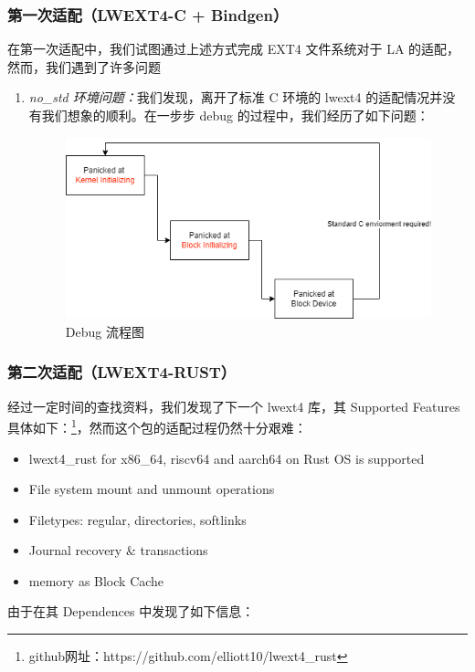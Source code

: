 \subsubsection{第一次适配（LWEXT4-C + Bindgen）}

在第一次适配中，我们试图通过上述方式完成 EXT4 文件系统对于 LA 的适配，然而，我们遇到了许多问题
\begin{enumerate} 
    \item \textit{no_std 环境问题：}我们发现，离开了标准 C 环境的 lwext4 的适配情况并没有我们想象的顺利。在一步步 debug 的过程中，我们经历了如下问题：
    \begin{figure}[htbp] 
        \centering 
        \includegraphics[width=0.5\linewidth]{figs/ext4c.png} 
        \caption{Debug 流程图} 
        \label{debug-ext4c} 
    \end{figure} 
\end{enumerate}

\subsubsection{第二次适配（LWEXT4-RUST）}

经过一定时间的查找资料，我们发现了下一个 lwext4 库，其 Supported Features 具体如下：\footnote{github网址：https://github.com/elliott10/lwext4_rust}，然而这个包的适配过程仍然十分艰难：

\begin{itemize}
    \item lwext4_rust for x86_64, riscv64 and aarch64 on Rust OS is supported
    \item File system mount and unmount operations
    \item Filetypes: regular, directories, softlinks
    \item Journal recovery \& transactions
    \item memory as Block Cache
\end{itemize}

由于在其 Dependences 中发现了如下信息：

